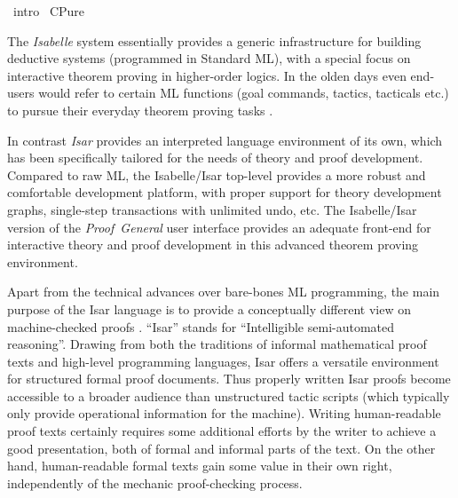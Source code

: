 %
\begin{isabellebody}%
\def\isabellecontext{intro}%
%
\isadelimtheory
\isanewline
\isanewline
%
\endisadelimtheory
%
\isatagtheory
{}\isamarkupfalse%
\ intro\isanewline
{}\ CPure\isanewline
{}%
\endisatagtheory
{\isafoldtheory}%
%
\isadelimtheory
%
\endisadelimtheory
%
\isamarkuptrue%
%
\isamarkuptrue%
%
\begin{isamarkuptext}%
The \emph{Isabelle} system essentially provides a generic
  infrastructure for building deductive systems (programmed in
  Standard ML), with a special focus on interactive theorem proving in
  higher-order logics.  In the olden days even end-users would refer
  to certain ML functions (goal commands, tactics, tacticals etc.) to
  pursue their everyday theorem proving tasks
  \cite{isabelle-intro,isabelle-ref}.
  
  In contrast \emph{Isar} provides an interpreted language environment
  of its own, which has been specifically tailored for the needs of
  theory and proof development.  Compared to raw ML, the Isabelle/Isar
  top-level provides a more robust and comfortable development
  platform, with proper support for theory development graphs,
  single-step transactions with unlimited undo, etc.  The
  Isabelle/Isar version of the \emph{Proof~General} user interface
  \cite{proofgeneral,Aspinall:TACAS:2000} provides an adequate
  front-end for interactive theory and proof development in this
  advanced theorem proving environment.

  \medskip Apart from the technical advances over bare-bones ML
  programming, the main purpose of the Isar language is to provide a
  conceptually different view on machine-checked proofs
  \cite{Wenzel:1999:TPHOL,Wenzel-PhD}.  ``Isar'' stands for
  ``Intelligible semi-automated reasoning''.  Drawing from both the
  traditions of informal mathematical proof texts and high-level
  programming languages, Isar offers a versatile environment for
  structured formal proof documents.  Thus properly written Isar
  proofs become accessible to a broader audience than unstructured
  tactic scripts (which typically only provide operational information
  for the machine).  Writing human-readable proof texts certainly
  requires some additional efforts by the writer to achieve a good
  presentation, both of formal and informal parts of the text.  On the
  other hand, human-readable formal texts gain some value in their own
  right, independently of the mechanic proof-checking process.


\end{isamarkuptext}
\end{isabellebody}
